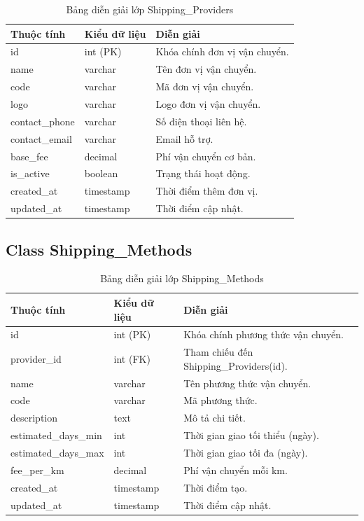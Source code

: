\begin{table}[H]
\centering
\caption{Bảng diễn giải lớp Shipping\_Providers}
\label{tab:shipping_providers}
\begin{tabular}{|l|l|p{7cm}|}
\hline
\textbf{Thuộc tính} & \textbf{Kiểu dữ liệu} & \textbf{Diễn giải} \\ \hline
id & int (PK) & Khóa chính đơn vị vận chuyển. \\ \hline
name & varchar & Tên đơn vị vận chuyển. \\ \hline
code & varchar & Mã đơn vị vận chuyển. \\ \hline
logo & varchar & Logo đơn vị vận chuyển. \\ \hline
contact\_phone & varchar & Số điện thoại liên hệ. \\ \hline
contact\_email & varchar & Email hỗ trợ. \\ \hline
base\_fee & decimal & Phí vận chuyển cơ bản. \\ \hline
is\_active & boolean & Trạng thái hoạt động. \\ \hline
created\_at & timestamp & Thời điểm thêm đơn vị. \\ \hline
updated\_at & timestamp & Thời điểm cập nhật. \\ \hline
\end{tabular}
\end{table}

\subsection{Class Shipping\_Methods}

\begin{table}[H]
\centering
\caption{Bảng diễn giải lớp Shipping\_Methods}
\label{tab:shipping_methods}
\begin{tabular}{|l|l|p{7cm}|}
\hline
\textbf{Thuộc tính} & \textbf{Kiểu dữ liệu} & \textbf{Diễn giải} \\ \hline
id & int (PK) & Khóa chính phương thức vận chuyển. \\ \hline
provider\_id & int (FK) & Tham chiếu đến Shipping\_Providers(id). \\ \hline
name & varchar & Tên phương thức vận chuyển. \\ \hline
code & varchar & Mã phương thức. \\ \hline
description & text & Mô tả chi tiết. \\ \hline
estimated\_days\_min & int & Thời gian giao tối thiểu (ngày). \\ \hline
estimated\_days\_max & int & Thời gian giao tối đa (ngày). \\ \hline
fee\_per\_km & decimal & Phí vận chuyển mỗi km. \\ \hline
created\_at & timestamp & Thời điểm tạo. \\ \hline
updated\_at & timestamp & Thời điểm cập nhật. \\ \hline
\end{tabular}
\end{table}

